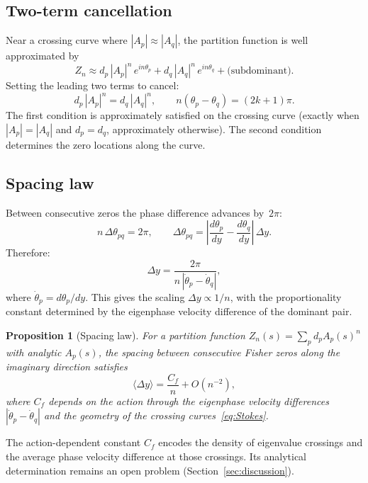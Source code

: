 \documentclass[12pt]{article}
\newtheorem{proposition}[theorem]{Proposition}
\theoremstyle{definition}
\theoremstyle{remark}
\newcommand{\avg}[1]{\langle #1 \rangle}
\begin{document}
\subsection{Two-term cancellation}

Near a crossing curve where $|A_p| \approx |A_q|$, the partition
function is well approximated by
\begin{equation}\label{eq:two_term}
Z_n \approx d_p\,|A_p|^n\,e^{in\theta_p} + d_q\,|A_q|^n\,e^{in\theta_q}
+ \text{(subdominant)}.
\end{equation}
Setting the leading two terms to cancel:
\begin{equation}
d_p\,|A_p|^n = d_q\,|A_q|^n, \qquad
n(\theta_p - \theta_q) = (2k+1)\pi.
\end{equation}
The first condition is approximately satisfied on the crossing curve
(exactly when $|A_p| = |A_q|$ and $d_p = d_q$, approximately
otherwise).  The second condition determines the zero locations along
the curve.

\subsection{Spacing law}

Between consecutive zeros the phase difference advances by~$2\pi$:
\begin{equation}
n\,\Delta\theta_{pq} = 2\pi, \qquad
\Delta\theta_{pq} = \left|\frac{d\theta_p}{dy} - \frac{d\theta_q}{dy}\right|\,\Delta y.
\end{equation}
Therefore:
\begin{equation}\label{eq:spacing}
\Delta y = \frac{2\pi}{n\,|\dot\theta_p - \dot\theta_q|},
\end{equation}
where $\dot\theta_p = d\theta_p/dy$.  This gives the scaling
$\Delta y \propto 1/n$, with the proportionality constant determined by
the eigenphase velocity difference of the dominant pair.

\begin{proposition}[Spacing law]\label{prop:spacing}
For a partition function $Z_n(s) = \sum_p d_p A_p(s)^n$ with
analytic $A_p(s)$, the spacing between consecutive Fisher zeros
along the imaginary direction satisfies
\[
\avg{\Delta y} = \frac{C_f}{n} + O(n^{-2}),
\]
where $C_f$ depends on the action through the eigenphase velocity
differences $|\dot\theta_p - \dot\theta_q|$ and the geometry of the
crossing curves~\eqref{eq:Stokes}.
\end{proposition}

The action-dependent constant $C_f$ encodes the density of eigenvalue
crossings and the average phase velocity difference at those crossings.
Its analytical determination remains an open problem
(Section~\ref{sec:discussion}).
\end{document}
